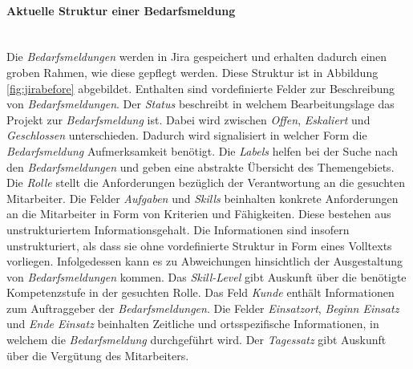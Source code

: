 \paragraph{Aktuelle Struktur einer Bedarfsmeldung}\mbox{} \\
Die \emph{Bedarfsmeldungen} werden in Jira gespeichert und erhalten dadurch einen groben Rahmen, wie diese gepflegt werden. Diese Struktur ist in Abbildung \ref{fig:jirabefore} abgebildet. Enthalten sind vordefinierte Felder zur Beschreibung von \emph{Bedarfsmeldungen}. Der \emph{Status} beschreibt in welchem Bearbeitungslage das Projekt zur \emph{Bedarfsmeldung} ist. Dabei wird zwischen \emph{Offen}, \emph{Eskaliert} und \emph{Geschlossen} unterschieden. Dadurch wird signalisiert in welcher Form die \emph{Bedarfsmeldung} Aufmerksamkeit benötigt. Die \emph{Labels} helfen bei der Suche nach den \emph{Bedarfsmeldungen} und geben eine abstrakte Übersicht des Themengebiets. Die \emph{Rolle} stellt die Anforderungen bezüglich der Verantwortung an die gesuchten Mitarbeiter. Die Felder \emph{Aufgaben} und \emph{Skills} beinhalten konkrete Anforderungen an die Mitarbeiter in Form von Kriterien und Fähigkeiten. Diese bestehen aus unstrukturiertem Informationsgehalt. Die Informationen sind insofern unstrukturiert, als dass sie ohne vordefinierte Struktur in Form eines Volltexts vorliegen. Infolgedessen kann es zu Abweichungen hinsichtlich der Ausgestaltung von \emph{Bedarfsmeldungen} kommen. Das \emph{Skill-Level} gibt Auskunft über die benötigte Kompetenzstufe in der gesuchten Rolle. Das Feld \emph{Kunde} enthält Informationen zum Auftraggeber der \emph{Bedarfsmeldungen}. Die Felder \emph{Einsatzort}, \emph{Beginn Einsatz} und \emph{Ende Einsatz} beinhalten Zeitliche und ortsspezifische Informationen, in welchem die \emph{Bedarfsmeldung} durchgeführt wird. Der \emph{Tagessatz} gibt Auskunft über die Vergütung des Mitarbeiters.
